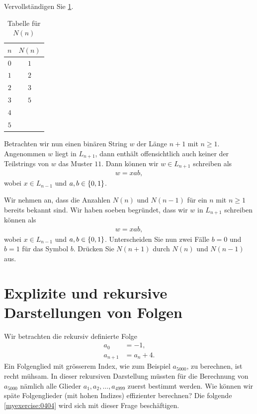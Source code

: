 \begin{myexercise}\label{myexercise:0402}
	Vervollständigen Sie \cref{table:Nn}.
	\begin{table}[H]
		\begin{center}
			\begin{tabular}{c|c}
				$n$ & $N(n)$ \\ \hline
				$0$ & $1$    \\
				$1$ & $2$    \\
				$2$ & $3$    \\
				$3$ & $5$    \\
				$4$ &        \\
				$5$ &        \\
			\end{tabular}
		\end{center}
		\caption{Tabelle für $N(n)$}
		\label{table:Nn}
	\end{table}
\end{myexercise}
\noindent
Betrachten wir nun einen binären String $w$ der Länge $n+1$ mit $n\geq 1$. Angenommen $w$ liegt in $L_{n+1}$, dann enthält offensichtlich auch keiner der Teilstrings von $w$ das Muster $11$. Dann können wir $w\in L_{n+1}$ schreiben als
\begin{align*}
	w = xab,
\end{align*}
wobei $x\in L_{n-1}$ und $a,b\in\left\{0,1\right\}$.

\begin{myexercise}\label{myexercise:0403}
	Wir nehmen an, dass die Anzahlen $N(n)$ und $N(n-1)$ für ein $n$ mit $n\geq 1$ bereits bekannt sind. Wir haben soeben begründet, dass wir $w$ in $L_{n+1}$ schreiben können als
	\begin{align*}
		w = xab,
	\end{align*}
	wobei $x\in L_{n-1}$ und $a,b\in\left\{0,1\right\}$. Unterscheiden Sie nun zwei Fälle $b = 0$ und $b = 1$ für das Symbol $b$. Drücken Sie $N(n+1)$ durch $N(n)$ und $N(n-1)$ aus.
\end{myexercise}

\section{Explizite und rekursive Darstellungen von Folgen}
Wir betrachten die rekursiv definierte Folge
\begin{align*}
	a_0     & = -1,      \\
	a_{n+1} & = a_n + 4.
\end{align*}
Ein Folgenglied mit grösserem Index, wie zum Beispiel $a_{5000}$, zu berechnen, ist recht mühsam. In dieser rekursiven Darstellung müssten für die Berechnung von
$a_{5000}$ nämlich alle Glieder $a_{1}, a_{2}, \ldots, a_{4999}$ zuerst bestimmt werden. Wie können wir späte Folgenglieder (mit hohen Indizes) effizienter berechnen? Die folgende \cref{myexercise:0404} wird sich mit dieser Frage beschäftigen.

